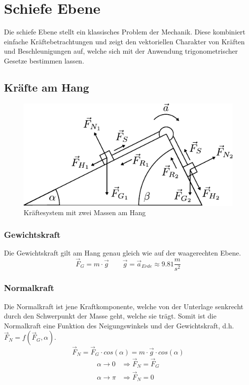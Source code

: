 \chapter{Schiefe Ebene}

Die schiefe Ebene stellt ein klassisches Problem der Mechanik. 
Diese kombiniert einfache Kräftebetrachtungen und zeigt den 
vektoriellen Charakter von Kräften und Beschleunigungen auf, welche sich 
mit der Anwendung trigonometrischer Gesetze bestimmen lassen.

\newpage
\section{Kräfte am Hang}
\begin{figure}[h!]
	\centering
	\includegraphics[scale=1]{../fig/schiefe-ebene-1.pdf}
	\caption{Kräftesystem mit zwei Massen am Hang}
	\label{fig:hangsystem}
\end{figure}

\subsection{Gewichtskraft}
Die Gewichtskraft gilt am Hang genau gleich wie auf der waagerechten Ebene.
\[ \boxed{\vec{F}_G = m \cdot \vec{g}} 
	\qquad \vec{g} = \vec{a}_{Erde} \approx 9.81\frac{m}{s^2} \]

\subsection{Normalkraft}
Die Normalkraft ist jene Kraftkomponente, welche von der Unterlage senkrecht
durch den Schwerpunkt der Masse geht, welche sie trägt. Somit ist die 
Normalkraft eine Funktion des Neigungswinkels und der Gewichtskraft, d.h.
$\vec{F}_N = f(\vec{F}_G, \alpha)$.
\[ \boxed{ \vec{F}_N 
	= \vec{F}_G \cdot cos(\alpha) 
	= m \cdot \vec{g} \cdot cos(\alpha)} 
\]
\[ \begin{array}{ll}
	\alpha \rightarrow 0 & \Rightarrow \vec{F}_N = \vec{F}_G \\
	\alpha \rightarrow \pi & \Rightarrow \vec{F}_N = 0
\end{array} \]

